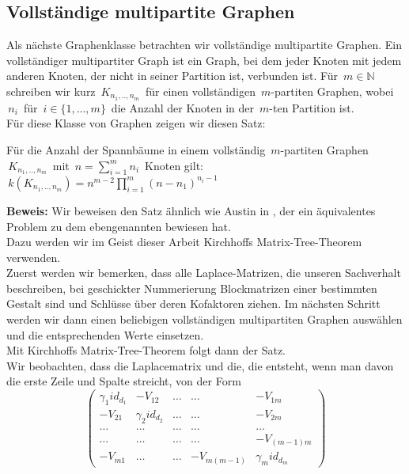 \subsection{Vollständige multipartite Graphen}
Als nächste Graphenklasse betrachten wir vollständige multipartite Graphen.
Ein vollständiger multipartiter Graph ist ein Graph, bei dem jeder Knoten mit jedem anderen Knoten, der nicht in seiner Partition ist, verbunden ist. Für $\,m\in \mathbb{N}\,$ schreiben wir kurz $\,K_{n_1,..,n_m}\,$ für einen vollständigen $\,m$-partiten Graphen, wobei $\,n_i\,$ für $\,i \in \{1,\ldots,m\}\,$ die Anzahl der Knoten in der $\,m$-ten Partition ist.\\
Für diese Klasse von Graphen zeigen wir diesen Satz:
\begin{Tms}
 Für die Anzahl der Spannbäume in einem vollständig $\,m$-partiten Graphen $\,K_{n_1,..,n_m}\,$ mit $\,n=\sum_{i=1}^mn_i\,$ Knoten gilt:\\
 $\,\mathit{k}(K_{n_1,..,n_m})=n^{m-2}\prod_{i=1}^{m}(n-n_1)^{n_i-1}$
\end{Tms}
\textbf{Beweis:}
Wir beweisen den Satz ähnlich wie Austin in \cite{austin_1960}, der ein äquivalentes Problem zu dem ebengenannten bewiesen hat.\\
Dazu werden wir im Geist dieser Arbeit Kirchhoffs Matrix-Tree-Theorem verwenden.\\
Zuerst werden wir bemerken, dass alle Laplace-Matrizen, die unseren Sachverhalt beschreiben, bei geschickter Nummerierung Blockmatrizen einer bestimmten Gestalt sind und Schlüsse über deren Kofaktoren ziehen. Im nächsten Schritt werden wir dann einen beliebigen vollständigen multipartiten Graphen auswählen und die entsprechenden Werte einsetzen.\\
Mit Kirchhoffs Matrix-Tree-Theorem folgt dann der Satz.\\
Wir beobachten, dass die Laplacematrix und die, die entsteht, wenn man davon die erste Zeile und Spalte streicht, von der Form
\begin{equation}
\begin{pmatrix}
 {\gamma_1}id_{d_1}&-V_{12}&\ldots&\ldots&-V_{1m}\\
 -V_{21}&{\gamma_2}id_{d_2}&\ldots&\ldots&-V_{2m}\\
 \ldots&\ldots&\ldots&\ldots&\ldots\\
  \ldots&\ldots&\ldots&\ldots&-V_{(m-1)m}\\
 -V_{m1}&\ldots&\ldots&-V_{m(m-1)}&{\gamma_m}id_{d_m}
\end{pmatrix}
\end{equation}
